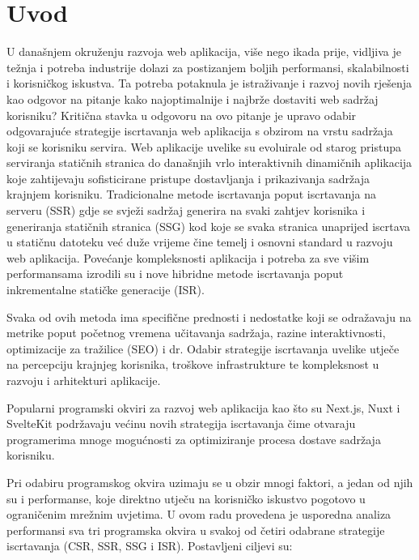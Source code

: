 \section{Uvod}

U današnjem okruženju razvoja web aplikacija, više nego ikada prije, vidljiva je težnja i potreba industrije dolazi  za postizanjem boljih performansi, skalabilnosti i korisničkog iskustva. Ta potreba potaknula je istraživanje i razvoj novih rješenja kao odgovor na pitanje kako najoptimalnije i najbrže dostaviti web sadržaj korisniku? Kritična stavka u odgovoru na ovo pitanje je upravo odabir odgovarajuće strategije iscrtavanja web aplikacija s obzirom na vrstu sadržaja koji se korisniku servira. Web aplikacije uvelike su evoluirale od starog pristupa serviranja statičnih stranica do današnjih vrlo interaktivnih dinamičnih aplikacija koje zahtijevaju sofisticirane pristupe dostavljanja i prikazivanja sadržaja krajnjem korisniku. \cite{moore2024rendering} Tradicionalne metode iscrtavanja poput iscrtavanja na serveru (SSR) gdje se svježi sadržaj generira na svaki zahtjev korisnika i generiranja statičnih stranica (SSG) kod koje se svaka stranica unaprijed iscrtava u statičnu datoteku već duže vrijeme čine temelj i osnovni standard u razvoju web aplikacija. Povećanje kompleksnosti aplikacija i potreba za sve višim performansama izrodili su i nove hibridne metode iscrtavanja poput inkrementalne statičke generacije (ISR).

\bigskip

Svaka od ovih metoda ima specifične prednosti i nedostatke koji se odražavaju na metrike poput početnog vremena učitavanja sadržaja, razine interaktivnosti, optimizacije za tražilice (SEO) i dr. Odabir strategije iscrtavanja uvelike utječe na percepciju krajnjeg korisnika, troškove infrastrukture te kompleksnost u razvoju i arhitekturi aplikacije.

\bigskip

Popularni programski okviri za razvoj web aplikacija kao što su Next.js, Nuxt i SvelteKit podržavaju većinu novih strategija iscrtavanja čime otvaraju programerima mnoge mogućnosti za optimiziranje procesa dostave sadržaja korisniku.

\bigskip

Pri odabiru programskog okvira uzimaju se u obzir mnogi faktori, a jedan od njih su i performanse, koje direktno utječu na korisničko iskustvo pogotovo u ograničenim mrežnim uvjetima.
U ovom radu provedena je usporedna analiza performansi sva tri programska okvira u svakoj od  četiri odabrane strategije iscrtavanja (CSR, SSR, SSG i ISR). Postavljeni ciljevi su:

